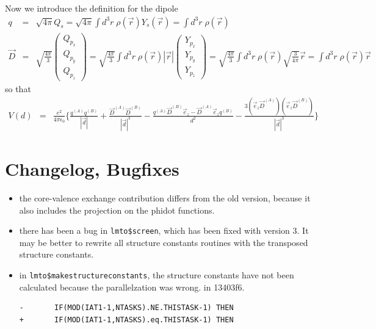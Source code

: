 \documentclass[11pt,a4paper]{report}
\begin{document}
Now we introduce the definition for the dipole
\begin{eqnarray*}
q&=&\sqrt{4\pi}Q_s=\sqrt{4\pi}\int d^3r\;\rho(\vec{r})Y_s(\vec{r})=\int d^3r\;\rho(\vec{r})
\\
\vec{D}&=&\sqrt{\frac{4\pi}{3}}\left(\begin{array}{c}Q_{p_x}\\Q_{p_y}\\Q_{p_z}\end{array}\right)
=\sqrt{\frac{4\pi}{3}}\int d^3r\;\rho(\vec{r})|\vec{r}|
\left(\begin{array}{c}Y_{p_x}\\Y_{p_y}\\Y_{p_z}\end{array}\right)
=\sqrt{\frac{4\pi}{3}}\int d^3r\;\rho(\vec{r})\sqrt{\frac{3}{4\pi}}\vec{r}
=\int d^3r\;\rho(\vec{r})\vec{r}
\end{eqnarray*}
so that
\begin{eqnarray*}
V(d)&=&
\frac{e^2}{4\pi\epsilon_0}\biggl\lbrace 
\frac{ q^{(A)}q^{(B)}}{|\vec{d}|}+\frac{\vec{D}^{(A)}\vec{D}^{(B)}}{|\vec{d}|^3}
-\frac{q^{(A)}\vec{D}^{(B)}\vec{e}_z-\vec{D}^{(A)}\vec{e}_zq^{(B)}}{d^2}
-\frac{ 3(\vec{e}_z\vec{D}^{(A)})(\vec{e}_z\vec{D}^{(B)})}{|\vec{d}|^3}
\biggr\rbrace
\end{eqnarray*}



\chapter{Changelog, Bugfixes}
\begin{itemize}
%
\item the core-valence exchange contribution differs from the old
  version, because it also includes the projection on the phidot
  functions.
%
\item there has been a bug in \verb|lmto$screen|, which has been fixed
  with version 3. It may be better to rewrite all structure constants
  routines with the transposed structure constants.
%
\item in \verb|lmto$makestructureconstants|, the structure constants
  have not been calculated because the parallelzation was wrong.  in
  13403f6.
\begin{verbatim}
-       IF(MOD(IAT1-1,NTASKS).NE.THISTASK-1) THEN
+       IF(MOD(IAT1-1,NTASKS).eq.THISTASK-1) THEN
\end{verbatim}
%
\end{itemize}


\clearpage
 
\end{document}
